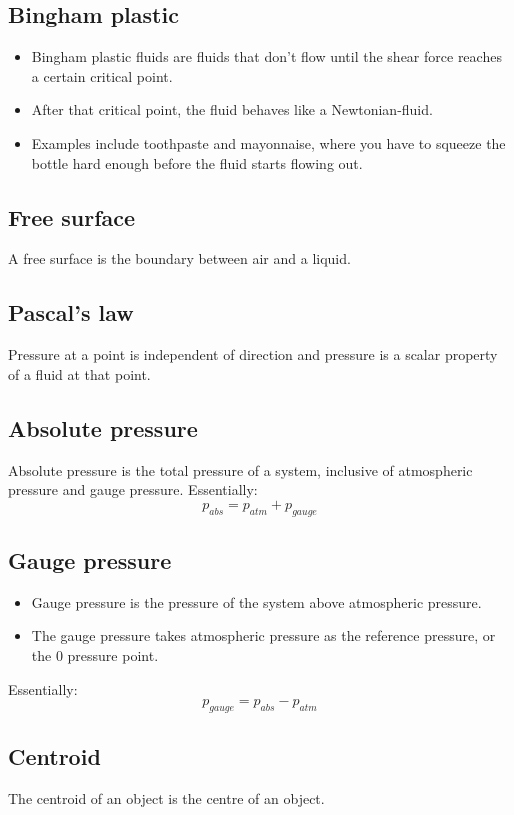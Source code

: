 \documentclass[11pt]{article}
\begin{document}
\subsection{Bingham plastic}
\label{sec:org4cd166b}
\begin{itemize}
\item Bingham plastic fluids are fluids that don't flow until the shear force reaches a certain critical point.
\item After that critical point, the fluid behaves like a Newtonian-fluid.
\item Examples include toothpaste and mayonnaise, where you have to squeeze the bottle hard enough before the fluid starts flowing out.
\end{itemize}

\subsection{Free surface}
\label{sec:org9fa2055}
A free surface is the boundary between air and a liquid.

\subsection{Pascal's law}
\label{sec:org373a80d}
Pressure at a point is independent of direction and pressure is a scalar property of a fluid at that point.

\subsection{Absolute pressure}
\label{sec:org1007a9d}
Absolute pressure is the total pressure of a system, inclusive of atmospheric pressure and gauge pressure. Essentially:
\[p_{abs} = p_{atm} + p_{gauge}\]

\subsection{Gauge pressure}
\label{sec:org90330d6}
\begin{itemize}
\item Gauge pressure is the pressure of the system above atmospheric pressure.
\item The gauge pressure takes atmospheric pressure as the reference pressure, or the 0 pressure point.
\end{itemize}

Essentially:
\[p_{gauge} = p_{abs} - p_{atm}\]

\subsection{Centroid}
\label{sec:orgb2050a2}
The centroid of an object is the centre of an object.
\end{document}
